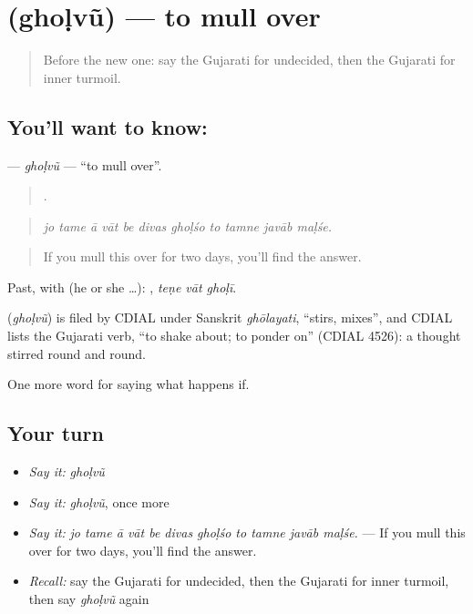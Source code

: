 \section[\texorpdfstring{\gu{ઘોળવું} (ghoḷvũ)}{ઘોળવું (ghoḷvũ)}]{ (ghoḷvũ) — to mull over}

\label{lesson:GU-C538-gholvu}



\begin{quote}
Before the new one: say the Gujarati for undecided, then the Gujarati for inner turmoil.
\end{quote}

\subsection*{You'll want to know: }
\textbf{} — \emph{ghoḷvũ} — \textquotedblleft{}to mull over\textquotedblright{}.

\begin{quote}
          .
\end{quote}

\begin{quote}
\emph{jo tame ā vāt be divas ghoḷśo to tamne javāb maḷśe.}
\end{quote}

\begin{quote}
If you mull this over for two days, you'll find the answer.
\end{quote}

Past, with  (he or she …):   , \emph{teṇe vāt ghoḷī}.

\begin{cousinweb}
\textbf{} (\emph{ghoḷvũ}) is filed by CDIAL under Sanskrit \emph{ghōlayati}, \textquotedblleft{}stirs, mixes\textquotedblright{}, and CDIAL lists the Gujarati verb, \textquotedblleft{}to shake about; to ponder on\textquotedblright{} (CDIAL 4526): a thought stirred round and round.
\end{cousinweb}

\begin{grammarlens}[title={What you've built}]
One more word for saying what happens if.
\end{grammarlens}

\subsection*{Your turn}
\begin{itemize}
\raggedright
  \item \emph{Say it:} \emph{ghoḷvũ}
  \item \emph{Say it:} \emph{ghoḷvũ}, once more
  \item \emph{Say it:} \emph{jo tame ā vāt be divas ghoḷśo to tamne javāb maḷśe.} — If you mull this over for two days, you'll find the answer.
  \item \emph{Recall:} say the Gujarati for undecided, then the Gujarati for inner turmoil, then say \emph{ghoḷvũ} again
\end{itemize}


